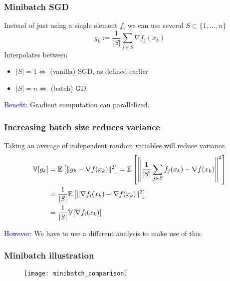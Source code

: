 \documentclass[aspectratio=149]{beamer}
\begin{document}
\begin{frame}
  \frametitle{Minibatch SGD}
  Instead of just using a single element $f_i$ we can use several $S \subset \{1, \dots, n\}$
  \begin{equation}
    g_k := \frac{1}{\vert S \vert} \sum_{j\in S} \nabla f_j(x_k)
  \end{equation}
  Interpolates between
  \begin{itemize}
    \item $\vert S \vert=1 \Leftrightarrow $ (vanilla) SGD, as defined earlier
    \item $\vert S \vert= n \Leftrightarrow$ (batch) GD
  \end{itemize}

  \textcolor{blue}{Benefit:} Gradient computation can parallelized.

\end{frame}


\begin{frame}
  \frametitle{Increasing batch size reduces variance}

  Taking an average of independent random variables will reduce variance.
  \begin{align}
    \mathbb{V}[g_k] &= \mathbb{E} \left[ \Vert g_k - \nabla f(x_k) \Vert^2 \right] = \mathbb{E} \left[ \left\Vert \frac{1}{\vert S \vert} \sum_{j\in S} f_j(x_k) - \nabla f(x_k) \right\Vert^2 \right] \\
              &= \frac{1}{\vert S \vert} \mathbb{E} \left[\Vert \nabla f_i(x_k) - \nabla f(x_k) \Vert^2\right] \\
    &= \frac{1}{\vert S \vert} \mathbb{V}[ \nabla f_i(x_k) ]
  \end{align}

  \textcolor{blue}{However:} We have to use a different analysis to make use of this.
\end{frame}


\begin{frame}
  \frametitle{Minibatch illustration}
  \begin{figure}[ht]
    \centering
    \texttt{[image: minibatch\_comparison]}
  \end{figure}
\end{frame}
\end{document}
